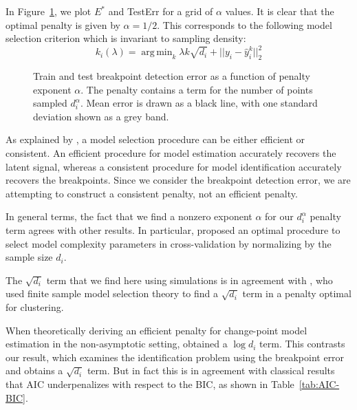 \documentclass{jsfds} %
\newcommand{\fig}[3][H]{
  \begin{figure}[#1]
    \hskip -1cm
    
    \caption{#3}
    \label{fig:#2}
  \end{figure}
}
\DeclareMathOperator*{\argmin}{arg\,min}
\begin{document}
In Figure~\ref{fig:variable-density-error-alpha}, we plot $E^*$ and
TestErr for a grid of $\alpha$ values.
It is clear that the optimal penalty is given by $\alpha=1/2$. This
corresponds to the following model selection criterion which is
invariant to sampling density:
\begin{equation}
  \label{eq:var_dens_opt_pen}
  k_i(\lambda) = \argmin_k \lambda k \sqrt{d_i}+||y_i-\hat y_i^k||^2_2
\end{equation}

\fig{variable-density-error-alpha}{Train and test breakpoint detection
  error as a function of penalty exponent $\alpha$. The penalty
  contains a term for the number of points sampled $d_i^\alpha$. Mean
  error is drawn as a black line, with one standard deviation shown as
  a grey band.}

\newpage

As explained by \citet{sylvain-survey}, a model selection procedure
can be either efficient or consistent. An efficient procedure for
model estimation accurately recovers the latent signal, whereas a
consistent procedure for model identification accurately recovers the
breakpoints. Since we consider the breakpoint detection error, we are
attempting to construct a consistent penalty, not an efficient
penalty.

In general terms, the fact that we find a nonzero exponent $\alpha$
for our $d_i^\alpha$ penalty term agrees with other results. In
particular, \citet{vfold} proposed an optimal procedure to select model
complexity parameters in cross-validation by normalizing by the sample
size $d_i$. 

The $\sqrt{d_i}$ term that we find here using simulations is in
agreement with \citet{aurelie}, who used finite sample model selection
theory to find a $\sqrt{d_i}$ term in a penalty optimal for
clustering.

When theoretically deriving an efficient penalty for change-point
model estimation in the non-asymptotic setting, \citet{lebarbier}
obtained a $\log d_i$ term. This contrasts our result, which examines
the identification problem using the breakpoint error and obtains a
$\sqrt{d_i}$ term. But in fact this is in agreement with classical
results that AIC underpenalizes with respect to the BIC, as shown in
Table~\ref{tab:AIC-BIC}.
\end{document}
